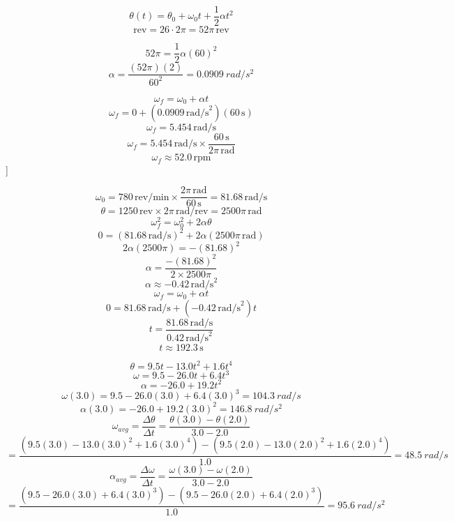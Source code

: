 \documentclass[11pt]{homework}
\begin{document}
\question
\begin{alphaparts}
\questionpart
\[
\theta(t)=\theta_{0}+\omega_{0}t+\frac{1}{2}\alpha t^2
\]
\[
    \text{rev} = 26\cdot2\pi = 52\pi \, \text{rev}
\]

\[
52\pi=\frac{1}{2} \alpha (60)^2
\]
\[
    \alpha = \frac{(52\pi)(2)}{60^2}=\boxed{\qty{0.0909}{rad /s^2}}
\]

\questionpart
\[
\omega_f = \omega_0 + \alpha t
\]
\[
\omega_f = 0 + (0.0909 \, \text{rad/s}^2)(60 \, \text{s})
\]
\[
\omega_f = 5.454 \, \text{rad/s}
\]
\[
\omega_f = 5.454 \, \text{rad/s} \times \frac{60 \, \text{s}}{2\pi \, \text{rad}}
\]
\[
    \omega_f \approx \boxed{52.0 \, \text{rpm}}
\]]
\end{alphaparts}

\question
\begin{alphaparts}
\questionpart
\[
\omega_0 = 780 \, \text{rev/min} \times \frac{2\pi \, \text{rad}}{60 \, \text{s}} = 81.68 \, \text{rad/s}
\]
\[
\theta = 1250 \, \text{rev} \times 2\pi \, \text{rad/rev} = 2500\pi \, \text{rad}
\]
\[
\omega_f^2 = \omega_0^2 + 2\alpha\theta
\]
\[
0= (81.68 \, \text{rad/s})^2 + 2\alpha (2500\pi \, \text{rad})
\]
\[
2\alpha (2500\pi) = -(81.68)^2
\]
\[
\alpha = \frac{-(81.68)^2}{2 \times 2500\pi}
\]
\[
    \alpha \approx \boxed{-0.42 \, \text{rad/s}^2}
\]
\questionpart
\[
\omega_f = \omega_0 + \alpha t
\]
\[
 0= 81.68 \, \text{rad/s} + (-0.42 \, \text{rad/s}^2) t
\]
\[
t = \frac{81.68 \, \text{rad/s}}{0.42 \, \text{rad/s}^2}
\]
\[
    t \approx \boxed{192.3 \, \text{s}}
\]
\end{alphaparts}


\setcounter{questionCounter}{24}
\question
\begin{alphaparts}
\questionpart
\[
 \theta = 9.5 t - 13.0 t^2 + 1.6 t^4 
\]
\[
 \omega = 9.5 - 26.0 t + 6.4 t^3 
\]
\questionpart
\[
 \alpha = -26.0 + 19.2t^2 
\]
\questionpart
\[
 \omega(3.0) = 9.5 - 26.0(3.0) + 6.4 (3.0)^3 = \boxed{\qty{104.3}{rad /s}}
\]
\[
 \alpha(3.0) = -26.0 + 19.2(3.0)^2 = \boxed{\qty{146.8}{rad /s^2}} 
\]
\questionpart
\[
    \omega_{avg} = \frac{\Delta \theta}{\Delta t} = \frac{\theta(3.0)-\theta(2.0)}{3.0-2.0}
    \]\[
    =\frac{(9.5 (3.0) - 13.0 (3.0)^2 + 1.6 (3.0)^4)-(9.5 (2.0) - 13.0 (2.0)^2 + 1.6 (2.0)^4)}{1.0}=\boxed{\qty{48.5}{rad /s}}
\]
\questionpart
\[
    \alpha_{avg}= \frac{\Delta \omega}{\Delta t}=\frac{\omega(3.0)-\omega(2.0)}{3.0-2.0}
\]
\[
    =\frac{(9.5 - 26.0(3.0) + 6.4 (3.0)^3)-(9.5 - 26.0 (2.0) + 6.4 (2.0)^3)}{1.0} = \boxed{\qty{95.6}{rad /s^2}}
\]


\end{alphaparts}
\end{document}
